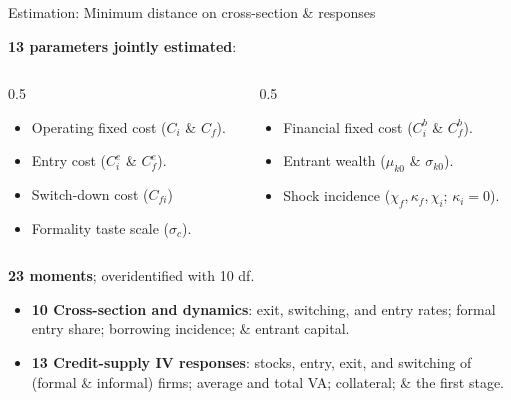 \documentclass[aspectratio=169]{beamer}
\begin{document}
\begin{frame}{Estimation: Minimum distance on cross-section \& responses}
\label{minimum_distance}
 
\textbf{13 parameters jointly estimated}:
 
\begin{columns}
    \begin{column}{0.5\textwidth}
        \begin{itemize}
            \item Operating fixed cost ($C_i$ \& $C_f$).
            \item Entry cost ($C^e_i$ \& $C^e_f$).
            \item Switch-down cost ($C_{fi}$) 
            \item Formality taste scale ($\sigma_c$).
        \end{itemize}
    \end{column}
 
    \begin{column}{0.5\textwidth}
        \begin{itemize}
            \item Financial fixed cost ($C^b_i$ \& $C^b_f$).
            \item Entrant wealth ($\mu_{k0}$ \& $\sigma_{k0}$).
            \item Shock incidence ($\chi_f, \kappa_f, \chi_i$; $\kappa_i=0$).
        \end{itemize}
    \end{column}
\end{columns}
 
\vspace{8mm}\pause
 
\textbf{23 moments}; overidentified with 10 df.
\begin{itemize}
    \item \textbf{10 Cross-section and dynamics}: exit, switching, and entry rates; formal entry share; borrowing incidence; \& entrant capital.
    \item \textbf{13 Credit-supply IV responses}: stocks, entry, exit, and switching of (formal \& informal) firms; average and total VA; collateral; \& the first stage.
\end{itemize}
 
\vspace{2mm}

\hyperlink{gmmalgo}{} \quad \hyperlink{leading_moment}{} \quad \hyperlink{jacobian}{} \quad \hyperlink{sensitivity}{}
 
\end{frame}
 
\end{document}

